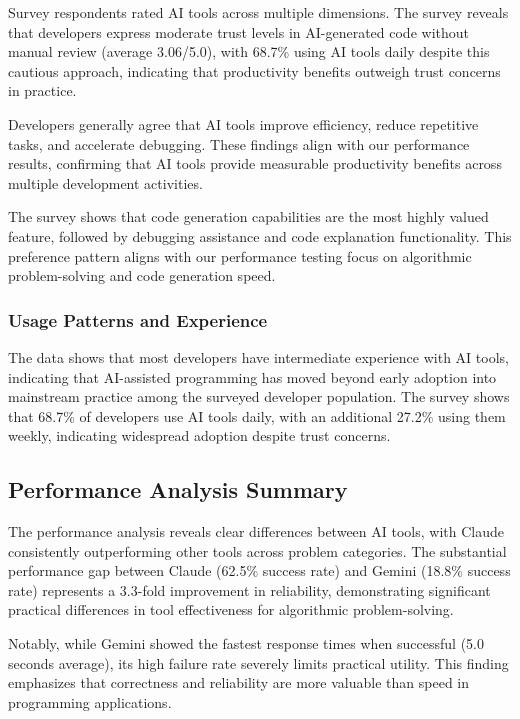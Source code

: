 \documentclass[conference]{IEEEtran}
\begin{document}
Survey respondents rated AI tools across multiple dimensions. The survey reveals that developers express moderate trust levels in AI-generated code without manual review (average 3.06/5.0), with 68.7\% using AI tools daily despite this cautious approach, indicating that productivity benefits outweigh trust concerns in practice.

Developers generally agree that AI tools improve efficiency, reduce repetitive tasks, and accelerate debugging. These findings align with our performance results, confirming that AI tools provide measurable productivity benefits across multiple development activities.

The survey shows that code generation capabilities are the most highly valued feature, followed by debugging assistance and code explanation functionality. This preference pattern aligns with our performance testing focus on algorithmic problem-solving and code generation speed.

\subsubsection{Usage Patterns and Experience}

The data shows that most developers have intermediate experience with AI tools, indicating that AI-assisted programming has moved beyond early adoption into mainstream practice among the surveyed developer population. The survey shows that 68.7\% of developers use AI tools daily, with an additional 27.2\% using them weekly, indicating widespread adoption despite trust concerns.

\subsection{Performance Analysis Summary}

The performance analysis reveals clear differences between AI tools, with Claude consistently outperforming other tools across problem categories. The substantial performance gap between Claude (62.5\% success rate) and Gemini (18.8\% success rate) represents a 3.3-fold improvement in reliability, demonstrating significant practical differences in tool effectiveness for algorithmic problem-solving.

Notably, while Gemini showed the fastest response times when successful (5.0 seconds average), its high failure rate severely limits practical utility. This finding emphasizes that correctness and reliability are more valuable than speed in programming applications.
\end{document}
